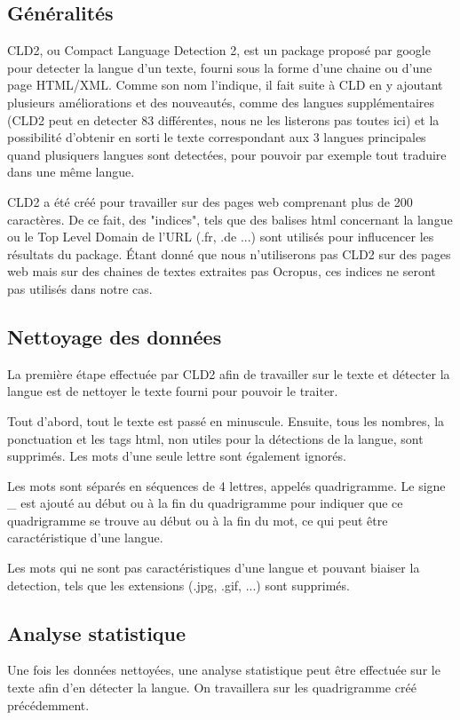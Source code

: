 \subsection{Généralités}
	CLD2, ou Compact Language Detection 2, est un package proposé par google pour detecter la langue d'un texte, fourni sous la forme d'une chaine ou d'une page HTML/XML. Comme son nom l'indique, il fait suite à CLD en y ajoutant plusieurs améliorations et des nouveautés, comme des langues supplémentaires (CLD2 peut en detecter 83 différentes, nous ne les listerons pas toutes ici) et la possibilité d'obtenir en sorti le texte correspondant aux 3 langues principales quand plusiquers langues sont detectées, pour pouvoir par exemple tout traduire dans une même langue.

	CLD2 a été créé pour travailler sur des pages web comprenant plus de 200 caractères. De ce fait, des "indices", tels que des balises html concernant la langue ou le Top Level Domain de l'URL (.fr, .de ...) sont utilisés pour influcencer les résultats du package. Étant donné que nous n'utiliserons pas CLD2 sur des pages web mais sur des chaines de textes extraites pas Ocropus, ces indices ne seront pas utilisés dans notre cas.

\subsection{Nettoyage des données}
	La première étape effectuée par CLD2 afin de travailler sur le texte et détecter la langue est de nettoyer le texte fourni pour pouvoir le traiter. 

	Tout d'abord, tout le texte est passé en minuscule. Ensuite, tous les nombres, la ponctuation et les tags html, non utiles pour la détections de la langue, sont supprimés. Les mots d'une seule lettre sont également ignorés. 

	Les mots sont séparés en séquences de 4 lettres, appelés quadrigramme. Le signe \_ est ajouté au début ou à la fin du quadrigramme pour indiquer que ce quadrigramme se trouve au début ou à la fin du mot, ce qui peut être caractéristique d'une langue.

	Les mots qui ne sont pas caractéristiques d'une langue et pouvant biaiser la detection, tels que les extensions (.jpg, .gif, ...) sont supprimés.

\subsection{Analyse statistique}
	Une fois les données nettoyées, une analyse statistique peut être effectuée sur le texte afin d'en détecter la langue. On travaillera sur les quadrigramme créé précédemment.

